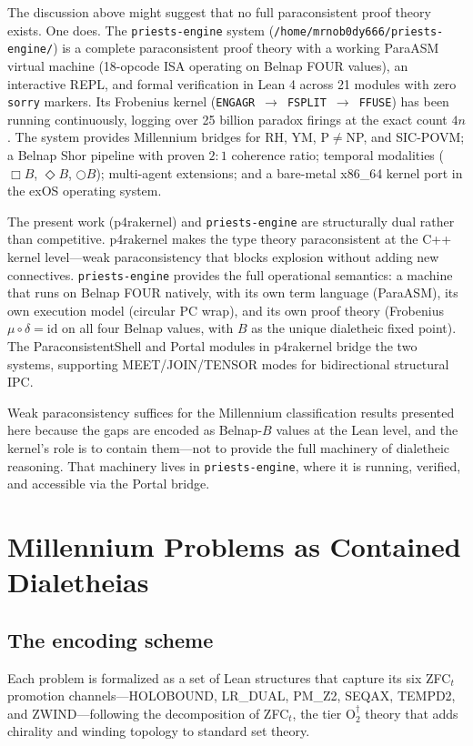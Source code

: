 \documentclass[11pt,a4paper]{article}
\theoremstyle{definition}
\begin{document}
The discussion above might suggest that no full paraconsistent proof theory
exists. One does. The {\tt priests-engine} system
(\texttt{/home/mrnob0dy666/priests-engine/}) is a complete paraconsistent proof
theory with a working ParaASM virtual machine (18-opcode ISA operating on Belnap
FOUR values), an interactive REPL, and formal verification in Lean 4 across 21
modules with zero {\tt sorry} markers. Its Frobenius kernel
(\texttt{ENGAGR}~$\to$~\texttt{FSPLIT}~$\to$~\texttt{FFUSE}) has been running
continuously, logging over 25 billion paradox firings at the exact count $4n$.
The system provides Millennium bridges for RH, YM, P$\neq$NP, and SIC-POVM; a
Belnap Shor pipeline with proven $2:1$ coherence ratio; temporal modalities
($\Box B$, $\Diamond B$, $\Circle B$); multi-agent extensions; and a bare-metal
x86\_64 kernel port in the exOS operating system.

The present work (p4rakernel) and {\tt priests-engine} are structurally dual
rather than competitive. p4rakernel makes the type theory paraconsistent at the
C++ kernel level---weak paraconsistency that blocks explosion without adding new
connectives. {\tt priests-engine} provides the full operational semantics: a
machine that runs on Belnap FOUR natively, with its own term language (ParaASM),
its own execution model (circular PC wrap), and its own proof theory (Frobenius
$\mu \circ \delta = \text{id}$ on all four Belnap values, with $B$ as the unique
dialetheic fixed point). The ParaconsistentShell and Portal modules in p4rakernel
bridge the two systems, supporting MEET/JOIN/TENSOR modes for bidirectional
structural IPC.

Weak paraconsistency suffices for the Millennium classification results presented
here because the gaps are encoded as Belnap-$B$ values at the Lean level, and the
kernel's role is to contain them---not to provide the full machinery of dialetheic
reasoning. That machinery lives in {\tt priests-engine}, where it is running,
verified, and accessible via the Portal bridge.

\section{Millennium Problems as Contained Dialetheias}

\subsection{The encoding scheme}

Each problem is formalized as a set of Lean structures that capture its six
ZFC$_t$ promotion channels---HOLOBOUND, LR\_DUAL, PM\_Z2, SEQAX, TEMPD2, and
ZWIND---following the decomposition of ZFC$_t$, the tier $\text{O}_2^\dagger$
theory that adds chirality and winding topology to standard set theory.
\end{document}

